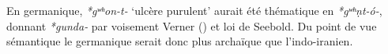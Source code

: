 \documentclass[11pt]{article}
\newcommand{\ipa}[1]{{\phon\textit{#1}}}
\begin{document}
En germanique, \ipa{*gʷʰon-t-} `ulcère purulent' aurait été thématique en \ipa{*gʷʰṇt-ó-}, donnant \ipa{*gunda-} par voisement Verner (\citealt[128]{schaffner01vernersche}) et loi de Seebold. Du point de vue sémantique le germanique serait donc plus archaïque que l'indo-iranien.






 
\end{document}

